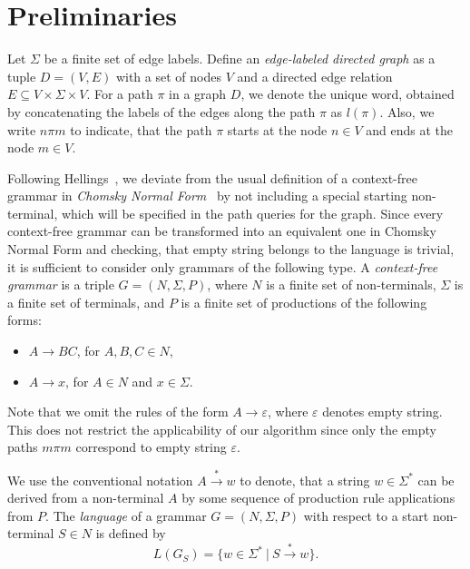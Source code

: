 \section{Preliminaries}
\label{section_preliminaries}

Let $\Sigma$ be a finite set of edge labels. Define an \emph{edge-labeled directed graph} as a tuple \mbox{$D = (V, E)$} with a set of nodes $V$ and a directed edge relation \mbox{$E \subseteq V \times \Sigma \times V$}.  For a path $\pi$ in a graph $D$, we denote the unique word, obtained by concatenating the labels of the edges along the path $\pi$ as \mbox{$l(\pi)$}. Also, we write \mbox{$n \pi m$} to indicate, that the path $\pi$ starts at the node \mbox{$n \in V$} and ends at the node \mbox{$m \in V$}.

Following Hellings~\cite{hellingsRelational}, we deviate from the usual definition of a context-free grammar in \emph{Chomsky Normal Form}~\cite{chomsky} by not including a special starting non-terminal, which will be specified in the path queries for the graph. Since every context-free grammar can be transformed into an equivalent one in Chomsky Normal Form and checking, that empty string belongs to the language is trivial, it is sufficient to consider only grammars of the following type. A \emph{context-free grammar} is a triple \mbox{$G = (N, \Sigma, P)$}, where $N$ is a finite set of non-terminals, $\Sigma$ is a finite set of terminals, and $P$ is a finite set of productions of the following forms:

\begin{itemize}
    \item $A \rightarrow B C$, for $A,B,C \in N$,
    \item $A \rightarrow x$, for $A \in N$ and $x \in \Sigma$.   
\end{itemize}

Note that we omit the rules of the form \mbox{$A \rightarrow \varepsilon$}, where $\varepsilon$ denotes empty string. This does not restrict the applicability of our algorithm since only the empty paths \mbox{$m \pi m$} correspond to empty string $\varepsilon$.

We use the conventional notation \mbox{$A \xrightarrow{*} w$} to denote, that a string \mbox{$w \in \Sigma^*$} can be derived from a non-terminal $A$ by some sequence of production rule applications from $P$. The \emph{language} of a grammar \mbox{$G = (N,\Sigma,P)$} with respect to a start non-terminal \mbox{$S \in N$} is defined by $$L(G_S) = \{w \in \Sigma^*~|~S \xrightarrow{*} w\}.$$

